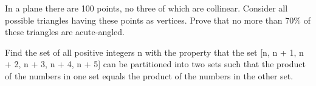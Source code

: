 \item In a plane there are 100 points, no three of which are collinear. Consider all
possible triangles having these points as vertices. Prove that no more than 70$\%$ of these triangles are acute-angled.\\
\item Find the set of all positive integers n with the property that the set [n, n + 1, n + 2, n + 3, n + 4, n + 5] can be partitioned into two sets such that the product of the numbers in one set equals the product of the numbers in the other set.

